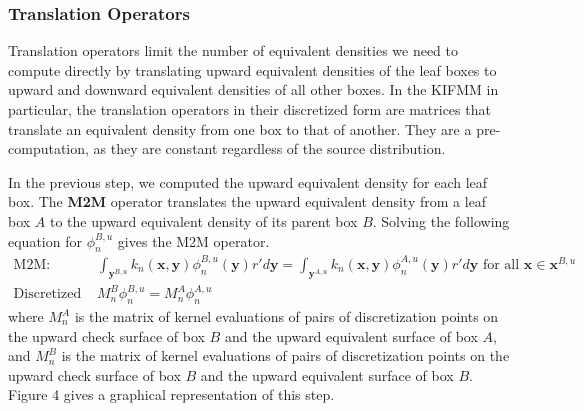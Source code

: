 \documentclass[12pt,letterpaper]{article}
\begin{document}
\subsubsection{Translation Operators}

Translation operators limit the number of equivalent densities we need to compute directly by translating upward equivalent densities of the leaf boxes to upward and downward equivalent densities of all other boxes. In the KIFMM in particular, the translation operators in their discretized form are matrices that translate an equivalent density from one box to that of another. They are a pre-computation, as they are constant regardless of the source distribution.

In the previous step, we computed the upward equivalent density for each leaf box. The \textbf{M2M} operator translates the upward equivalent density from a leaf box $A$ to the upward equivalent density of its parent box $B$. Solving the following equation for $\phi_n^{B,u}$ gives the M2M operator.
\begin{align}
\mbox{M2M: }&\int_{\mathbf{y}^{B,u}}{k_n(\mathbf{x},\mathbf{y})}\phi^{B,u}_n{(\mathbf{y})}r'd\mathbf{y} = \int_{\mathbf{y}^{A,u}}{k_n(\mathbf{x},\mathbf{y})}\phi^{A,u}_n{(\mathbf{y})}r'd\mathbf{y}\mbox{ for all }\mathbf{x}\in\mathbf{x}^{B,u}\\
\mbox{Discretized M2M: }&M_n^B\phi^{B,u}_n=M_n^A\phi^{A,u}_n
\end{align}
where $M_n^A$ is the matrix of kernel evaluations of pairs of discretization points on the upward check surface of box $B$ and the upward equivalent surface of box $A$, and $M_n^B$ is the matrix of kernel evaluations of pairs of discretization points on the upward check surface of box $B$ and the upward equivalent surface of box $B$. Figure 4 gives a graphical representation of this step.
\end{document}
